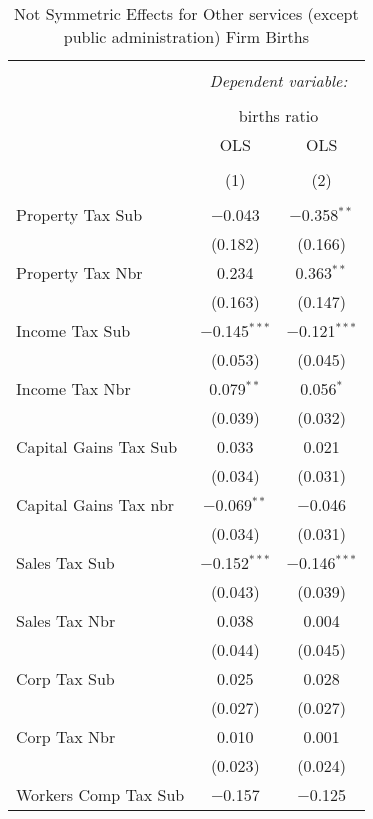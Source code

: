 
\begin{table}[!htbp] \centering 
  \caption{Not Symmetric Effects for  Other services (except public administration) Firm Births} 
  \label{81noequality} 
\footnotesize 
\begin{tabular}{@{\extracolsep{5pt}}lcc} 
\\[-1.8ex]\hline 
\hline \\[-1.8ex] 
 & \multicolumn{2}{c}{\textit{Dependent variable:}} \\ 
\cline{2-3} 
\\[-1.8ex] & \multicolumn{2}{c}{births ratio} \\ 
 & OLS & OLS \\ 
\\[-1.8ex] & (1) & (2)\\ 
\hline \\[-1.8ex] 
 Property Tax Sub & $-$0.043 & $-$0.358$^{**}$ \\ 
  & (0.182) & (0.166) \\ 
  Property Tax Nbr & 0.234 & 0.363$^{**}$ \\ 
  & (0.163) & (0.147) \\ 
  Income Tax Sub & $-$0.145$^{***}$ & $-$0.121$^{***}$ \\ 
  & (0.053) & (0.045) \\ 
  Income Tax Nbr & 0.079$^{**}$ & 0.056$^{*}$ \\ 
  & (0.039) & (0.032) \\ 
  Capital Gains Tax Sub & 0.033 & 0.021 \\ 
  & (0.034) & (0.031) \\ 
  Capital Gains Tax nbr & $-$0.069$^{**}$ & $-$0.046 \\ 
  & (0.034) & (0.031) \\ 
  Sales Tax Sub & $-$0.152$^{***}$ & $-$0.146$^{***}$ \\ 
  & (0.043) & (0.039) \\ 
  Sales Tax Nbr & 0.038 & 0.004 \\ 
  & (0.044) & (0.045) \\ 
  Corp Tax Sub & 0.025 & 0.028 \\ 
  & (0.027) & (0.027) \\ 
  Corp Tax Nbr & 0.010 & 0.001 \\ 
  & (0.023) & (0.024) \\ 
  Workers Comp Tax Sub & $-$0.157 & $-$0.125 \\ 

\end{tabular}
\end{table}
